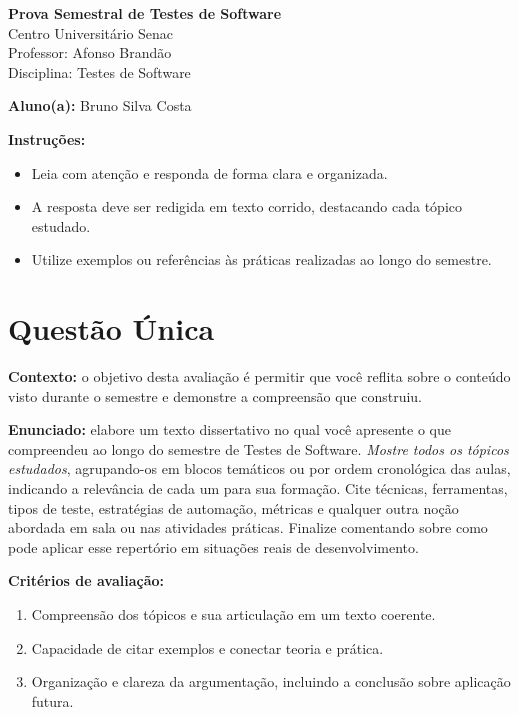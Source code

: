 \documentclass[12pt]{article}
\begin{document}
\newpage


\begin{center}
  {\Large \textbf{Prova Semestral de Testes de Software}}\\
  Centro Universitário Senac\\
  Professor: Afonso Brandão\\
  Disciplina: Testes de Software
\end{center}

\vspace{0.4cm}

\begin{center}
  \textbf{Aluno(a):} Bruno Silva Costa
\end{center}

\vspace{0.5cm}

\begin{center}
  \textbf{Instruções:}
\end{center}
\begin{itemize}[leftmargin=*]
  \item Leia com atenção e responda de forma clara e organizada.
  \item A resposta deve ser redigida em texto corrido, destacando cada tópico estudado.
  \item Utilize exemplos ou referências às práticas realizadas ao longo do semestre.
\end{itemize}

\section*{Questão Única}
\textbf{Contexto:} o objetivo desta avaliação é permitir que você reflita sobre o conteúdo visto durante o semestre e demonstre a compreensão que construiu.

\textbf{Enunciado:} elabore um texto dissertativo no qual você apresente o que compreendeu ao longo do semestre de Testes de Software. \textit{Mostre todos os tópicos estudados}, agrupando-os em blocos temáticos ou por ordem cronológica das aulas, indicando a relevância de cada um para sua formação. Cite técnicas, ferramentas, tipos de teste, estratégias de automação, métricas e qualquer outra noção abordada em sala ou nas atividades práticas. Finalize comentando sobre como pode aplicar esse repertório em situações reais de desenvolvimento.

\textbf{Critérios de avaliação:}
\begin{enumerate}[label=\arabic*.]
  \item Compreensão dos tópicos e sua articulação em um texto coerente.
  \item Capacidade de citar exemplos e conectar teoria e prática.
  \item Organização e clareza da argumentação, incluindo a conclusão sobre aplicação futura.
\end{enumerate}
\end{document}
